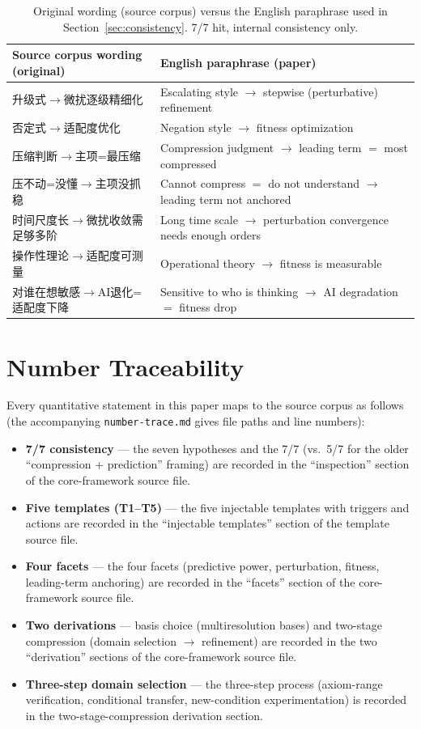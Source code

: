 \documentclass[11pt]{article}
\begin{document}
\begin{table}[htbp]
\centering
\small
\begin{tabular}{p{5.4cm}p{5.4cm}}
\toprule
Source corpus wording (original) & English paraphrase (paper) \\
\midrule
升级式$\to$微扰逐级精细化 & Escalating style $\to$ stepwise (perturbative) refinement \\
否定式$\to$适配度优化 & Negation style $\to$ fitness optimization \\
压缩判断$\to$主项=最压缩 & Compression judgment $\to$ leading term $=$ most compressed \\
压不动=没懂$\to$主项没抓稳 & Cannot compress $=$ do not understand $\to$ leading term not anchored \\
时间尺度长$\to$微扰收敛需足够多阶 & Long time scale $\to$ perturbation convergence needs enough orders \\
操作性理论$\to$适配度可测量 & Operational theory $\to$ fitness is measurable \\
对谁在想敏感$\to$AI退化=适配度下降 & Sensitive to who is thinking $\to$ AI degradation $=$ fitness drop \\
\bottomrule
\end{tabular}
\caption{Original wording (source corpus) versus the English paraphrase used in
Section~\ref{sec:consistency}. 7/7 hit, internal consistency only.}
\label{tab:seven_raw}
\end{table}

\section{Number Traceability}
\label{app:trace}

Every quantitative statement in this paper maps to the source corpus as follows
(the accompanying \texttt{number-trace.md} gives file paths and line numbers):

\begin{itemize}
\item \textbf{7/7 consistency} --- the seven hypotheses and the 7/7 (vs.\ 5/7
for the older ``compression + prediction'' framing) are recorded in the
``inspection'' section of the core-framework source file.
\item \textbf{Five templates (T1--T5)} --- the five injectable templates with
triggers and actions are recorded in the ``injectable templates'' section of the
template source file.
\item \textbf{Four facets} --- the four facets (predictive power, perturbation,
fitness, leading-term anchoring) are recorded in the ``facets'' section of the
core-framework source file.
\item \textbf{Two derivations} --- basis choice (multiresolution bases) and
two-stage compression (domain selection $\to$ refinement) are recorded in the
two ``derivation'' sections of the core-framework source file.
\item \textbf{Three-step domain selection} --- the three-step process
(axiom-range verification, conditional transfer, new-condition experimentation)
is recorded in the two-stage-compression derivation section.
\end{itemize}
\end{document}
